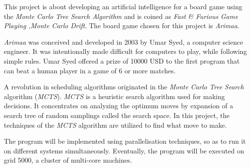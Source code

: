 This project is about developing an artificial intelligence for a board game using the \emph{Monte Carlo Tree Search Algorithm} and is coined as \emph{Fast \& Furious Game Playing ,Monte Carlo Drift}. The board game chosen for this project is \emph{Arimaa}.
\newline

\emph{Arimaa} was conceived and developed in 2003 by Umar Syed, a computer science engineer. It was intentionally made difficult for computers to play, while following simple rules. Umar Syed offered a prize of 10000 USD to the first program that can beat a human player in a game of 6 or more matches.
\newline

A revolution in scheduling algorithms originated in the \emph{Monte Carlo Tree Search} algorithm (\emph{MCTS}). \emph{MCTS} is a heuristic search algorithm used for making decisions. It concentrates on analyzing the optimum moves by expansion of a search tree of random samplings called the search space. In this project, the techniques of the \emph{MCTS} algorithm are utilized to find what move to make.
\newline

The program will be implemented using parallelisation techniques, so as to run it on different systems simultaneously. Eventually, the program will be executed on grid 5000, a cluster of multi-core machines.
